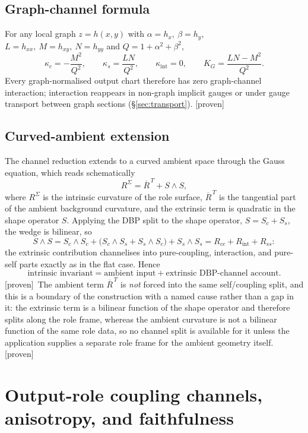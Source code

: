 \documentclass[11pt]{article}
\newcommand{\Proven}{\textsf{[proven]}}
\theoremstyle{plain}
\theoremstyle{definition}
\newcommand{\KG}{K_{G}}
\newcommand{\kc}{\kappa_{c}}
\newcommand{\kint}{\kappa_{\mathrm{int}}}
\newcommand{\ks}{\kappa_{s}}
\begin{document}
\subsection{Graph-channel formula}
For any local graph $z=h(x,y)$ with $\alpha=h_x,\ \beta=h_y$, $L=h_{xx},\ M=h_{xy},\ N=h_{yy}$ and
$Q=1+\alpha^2+\beta^2$,
\[
\kc=-\frac{M^2}{Q^2},\qquad \ks=\frac{LN}{Q^2},\qquad \kint=0,\qquad
\KG=\frac{LN-M^2}{Q^2}.
\]
Every graph-normalised output chart therefore has zero graph-channel interaction; interaction
reappears in non-graph implicit gauges or under gauge transport between graph sections
(\S\ref{sec:transport}). \Proven

\subsection{Curved-ambient extension}
The channel reduction extends to a curved ambient space through the Gauss equation, which reads
schematically
\[
R^\Sigma=\overline R^{\,T}+S\wedge S,
\]
where $R^\Sigma$ is the intrinsic curvature of the role surface, $\overline R^{\,T}$ is the tangential
part of the ambient background curvature, and the extrinsic term is quadratic in the shape operator
$S$. Applying the DBP split to the shape operator, $S=S_c+S_s$, the wedge is bilinear, so
\[
S\wedge S=S_c\wedge S_c+\bigl(S_c\wedge S_s+S_s\wedge S_c\bigr)+S_s\wedge S_s
=R_{cc}+R_{\mathrm{int}}+R_{ss}:
\]
the extrinsic contribution channelises into pure-coupling, interaction, and pure-self parts exactly as
in the flat case. Hence
\[
\text{intrinsic invariant}=\text{ambient input}+\text{extrinsic DBP-channel account}. 
\]
\Proven\ The ambient term $\overline R^{\,T}$ is \emph{not} forced into the same self/coupling split,
and this is a boundary of the construction with a named cause rather than a gap in it: the extrinsic
term is a bilinear function of the shape operator and therefore splits along the role frame, whereas
the ambient curvature is not a bilinear function of the same role data, so no channel split is
available for it unless the application supplies a separate role frame for the ambient geometry
itself. \Proven

\section{Output-role coupling channels, anisotropy, and faithfulness}
\label{sec:channels-named}
\end{document}
